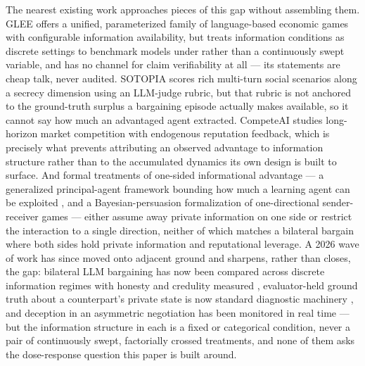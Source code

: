 \documentclass[11pt]{article}
\begin{document}
The nearest existing work approaches pieces of this gap without assembling them. GLEE \citep{GLEE} offers a unified, parameterized family of language-based economic games with configurable information availability, but treats information conditions as discrete settings to benchmark models under rather than a continuously swept variable, and has no channel for claim verifiability at all --- its statements are cheap talk, never audited. SOTOPIA \citep{SOTOPIA} scores rich multi-turn social scenarios along a secrecy dimension using an LLM-judge rubric, but that rubric is not anchored to the ground-truth surplus a bargaining episode actually makes available, so it cannot say how much an advantaged agent extracted. CompeteAI \citep{CompeteAI} studies long-horizon market competition with endogenous reputation feedback, which is precisely what prevents attributing an observed advantage to information structure rather than to the accumulated dynamics its own design is built to surface. And formal treatments of one-sided informational advantage --- a generalized principal-agent framework bounding how much a learning agent can be exploited \citep{LearningAgentPA}, and a Bayesian-persuasion formalization of one-directional sender-receiver games \citep{StrategicPersuasion} --- either assume away private information on one side or restrict the interaction to a single direction, neither of which matches a bilateral bargain where both sides hold private information and reputational leverage. A 2026 wave of work has since moved onto adjacent ground and sharpens, rather than closes, the gap: bilateral LLM bargaining has now been compared across discrete information regimes with honesty and credulity measured \citep{UsedCarSalesbots}, evaluator-held ground truth about a counterpart's private state is now standard diagnostic machinery \citep{TERMSBench}, and deception in an asymmetric negotiation has been monitored in real time \citep{ThinkingOutLoud} --- but the information structure in each is a fixed or categorical condition, never a pair of continuously swept, factorially crossed treatments, and none of them asks the dose-response question this paper is built around.
\end{document}
